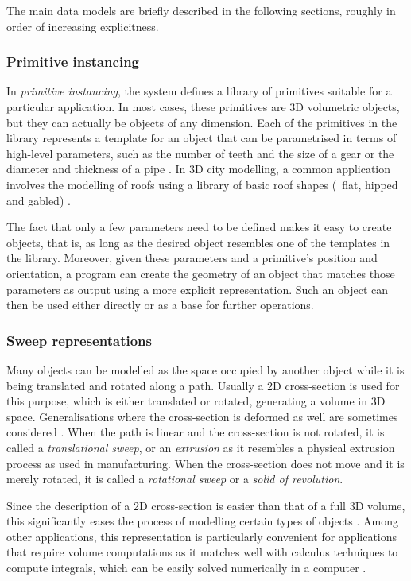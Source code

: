 The main data models are briefly described in the following sections, roughly in order of increasing explicitness.

\subsubsection{Primitive instancing}

In \emph{primitive instancing}, the system defines a library of primitives suitable for a particular application.
In most cases, these primitives are 3D volumetric objects, but they can actually be objects of any dimension.
Each of the primitives in the library represents a template for an object that can be parametrised in terms of high-level parameters, such as the number of teeth and the size of a gear or the diameter and thickness of a pipe \citep{Foley95}.
In 3D city modelling, a common application involves the modelling of roofs using a library of basic roof shapes (\eg\ flat, hipped and gabled) \citep{Kada07}.

The fact that only a few parameters need to be defined makes it easy to create objects, that is, as long as the desired object resembles one of the templates in the library.
Moreover, given these parameters and a primitive's position and orientation, a program can create the geometry of an object that matches those parameters as output using a more explicit representation.
Such an object can then be used either directly or as a base for further operations.

\subsubsection{Sweep representations}

Many objects can be modelled as the space occupied by another object while it is being translated and rotated along a path.
Usually a 2D cross-section is used for this purpose, which is either translated or rotated, generating a volume in 3D space.
Generalisations where the cross-section is deformed as well are sometimes considered \citep{Blackmore94}.
When the path is linear and the cross-section is not rotated, it is called a \emph{translational sweep}, or an \emph{extrusion} as it resembles a physical extrusion process as used in manufacturing.
When the cross-section does not move and it is merely rotated, it is called a \emph{rotational sweep} or a \emph{solid of revolution}.

Since the description of a 2D cross-section is easier than that of a full 3D volume, this significantly eases the process of modelling certain types of objects \citep{Weld90}.
Among other applications, this representation is particularly convenient for applications that require volume computations as it matches well with calculus techniques to compute integrals, which can be easily solved numerically in a computer \citep{Lee82}.

